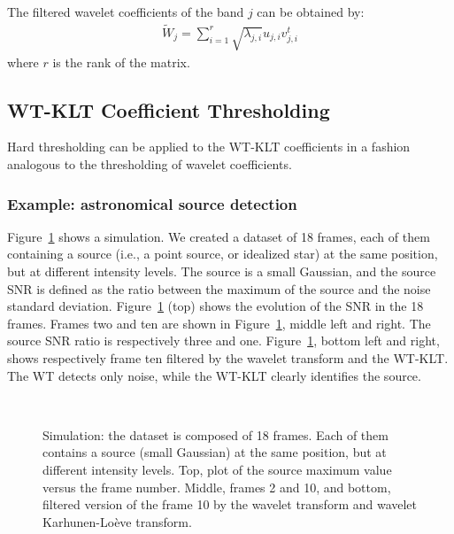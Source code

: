 The filtered wavelet coefficients of the band $j$ can be obtained by:
\begin{eqnarray}
\tilde W_j =  \sum_{i=1}^r \sqrt{\lambda_{j,i}}  {u}_{j,i} {v}_{j,i}^t
\end{eqnarray}
where $r$ is the rank of the matrix.


\subsection{WT-KLT Coefficient Thresholding}
Hard thresholding can  be applied to the  WT-KLT coefficients
in a fashion analogous to the thresholding of wavelet coefficients.

\subsubsection*{Example: astronomical source detection}

Figure~\ref{fig_exp_trans1} shows a simulation. We created
a dataset of 18 frames, each of them containing a source (i.e., a point
source, or idealized star) at the 
same position, 
but at different intensity levels. The source is a small Gaussian, and 
the source SNR is defined as the ratio between the maximum of the source and 
the noise standard deviation. Figure~\ref{fig_exp_trans1} (top) shows the
evolution of the SNR in the 18 frames. Frames two and ten 
are shown in Figure~\ref{fig_exp_trans1}, middle 
left and right. The source 
SNR ratio is respectively three and one. Figure~\ref{fig_exp_trans1}, bottom
left and right, shows respectively frame ten filtered by the 
 wavelet transform and the WT-KLT. The WT detects only noise, while the 
WT-KLT clearly identifies the source.

\begin{figure}[htb]
\centerline{
\vbox{
\hbox{ 
}
\hbox{ 
}
}}
\caption{Simulation: the dataset is composed of 18 frames. 
Each of them contains a source (small Gaussian) at the same position, 
but at different intensity levels. Top, plot of the source maximum value versus
the frame number. Middle, frames 2 and 10, and bottom, filtered version
of the frame 10 by the wavelet transform and wavelet Karhunen-Lo\`eve transform.}
\label{fig_exp_trans1}
\end{figure}


